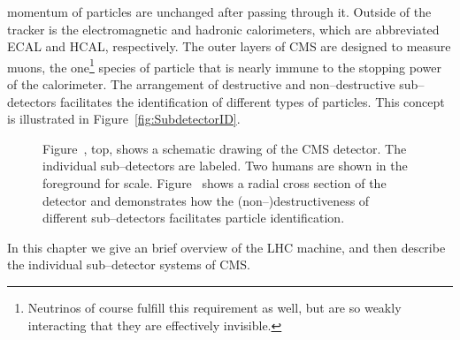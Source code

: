 momentum of particles are unchanged after passing through it.  Outside of the
tracker is the electromagnetic and hadronic calorimeters, which are abbreviated
ECAL and HCAL, respectively.  
The outer layers of CMS are designed to measure muons, the
one\footnote{Neutrinos of course fulfill this requirement as well, but are so
weakly interacting that they are effectively invisible.} species of particle
that is nearly immune to the stopping power of the calorimeter.  The arrangement of
destructive and non--destructive sub--detectors facilitates the identification
of different types of particles.  This concept is illustrated in
Figure~\ref{fig:SubdetectorID}.
\begin{figure}
  \centering
   \caption[Schematic drawings of the CMS
  detector]{Figure~, top, shows a schematic drawing of
  the CMS detector.  The individual sub--detectors are labeled.  Two humans are
  shown in the foreground for scale. Figure~ shows a
  radial cross section of the detector and demonstrates how the
  \mbox{(non--)destructiveness} of different sub--detectors facilitates particle
  identification.} \label{fig:AllCMSCutaways}
\end{figure}
In this chapter we give an brief overview of the LHC machine, and then describe
the individual sub--detector systems of CMS. 

